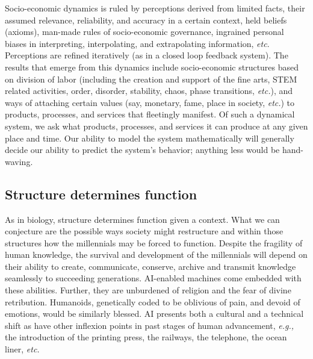 \begin{multicols}{2}
Socio-economic dynamics is ruled by perceptions derived from limited facts, their assumed relevance, reliability, and accuracy in a certain context, held beliefs (axioms), man-made rules of socio-economic governance, ingrained personal biases in interpreting, interpolating, and extrapolating information, \textit{etc}. Perceptions are refined iteratively (as in a closed loop feedback system). The results that emerge from this dynamics include socio-economic structures based on division of labor (including the creation and support of the fine arts, STEM related activities, order, disorder, stability, chaos, phase transitions, \textit{etc.}), and ways of attaching certain values (say, monetary, fame, place in society, \textit{etc.}) to products, processes, and services that fleetingly manifest. Of such a dynamical system, we ask what products, processes, and services it can produce at any given place and time. Our ability to model the system mathematically will generally decide our ability to predict the system's behavior; anything less would be hand-waving.

\subsection{Structure determines function}

As in biology, structure determines function given a context. What we can conjecture are the possible ways society might restructure and within those structures how the millennials may be forced to function. Despite the fragility of human knowledge, the survival and development of the millennials will depend on their ability to create, communicate, conserve, archive and transmit knowledge seamlessly to succeeding generations. AI-enabled machines come embedded with these abilities. Further, they are unburdened of religion and the fear of divine retribution. Humanoids, genetically coded to be oblivious of pain, and devoid of emotions, would be similarly blessed. AI presents both a cultural and a technical shift as have other inflexion points in past stages of human advancement, \textit{e.g.,} the introduction of the printing press, the railways, the telephone, the ocean liner, \textit{etc.} 


\end{multicols}
